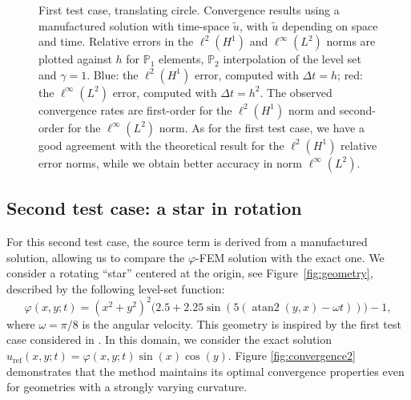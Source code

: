 \documentclass[11pt,a4paper]{article}
\theoremstyle{plain}
\theoremstyle{definition}
\theoremstyle{remark}
\numberwithin{equation}{section}
\newcommand{\logLogSlopeTriangle}[5]
{

    \pgfplotsextra
    {
        \pgfkeysgetvalue{/pgfplots/xmin}{\xmin}
        \pgfkeysgetvalue{/pgfplots/xmax}{\xmax}
        \pgfkeysgetvalue{/pgfplots/ymin}{\ymin}
        \pgfkeysgetvalue{/pgfplots/ymax}{\ymax}

        \pgfmathsetmacro{\xArel}{#1}
        \pgfmathsetmacro{\yArel}{#3}
        \pgfmathsetmacro{\xBrel}{#1-#2}
        \pgfmathsetmacro{\yBrel}{\yArel}
        \pgfmathsetmacro{\xCrel}{\xArel}

        \pgfmathsetmacro{\lnxB}{\xmin*(1-(#1-#2))+\xmax*(#1-#2)} %
        \pgfmathsetmacro{\lnxA}{\xmin*(1-#1)+\xmax*#1} %
        \pgfmathsetmacro{\lnyA}{\ymin*(1-#3)+\ymax*#3} %
        \pgfmathsetmacro{\lnyC}{\lnyA+#4*(\lnxA-\lnxB)}
        \pgfmathsetmacro{\yCrel}{(\lnyC-\ymin)/(\ymax-\ymin)} %

        \coordinate (A) at (rel axis cs:\xArel,\yArel);
        \coordinate (B) at (rel axis cs:\xBrel,\yBrel);
        \coordinate (C) at (rel axis cs:\xCrel,\yCrel);

        \draw[#5]   (A)-- node[pos=0.5,anchor=north] {1}
                    (B)--
                    (C)-- node[pos=0.5,anchor=west] {#4}
                    cycle;
    }
}
\begin{document}
\begin{figure}[h]
    \centering
    
    \begin{center}
    \end{center}
    
    \caption{First test case, translating circle. Convergence results using a manufactured solution with time-space $\tilde{u}$, with $\tilde{u}$ depending on space and time. Relative errors in the $\ell^2(H^1)$ and $\ell^\infty(L^2)$ norms are plotted against $h$ for $\mathbb{P}_1$ elements, $\mathbb{P}_2$ interpolation of the level set and $\gamma=1$. Blue: the $\ell^2(H^1)$ error, computed with $\Delta t = h$; red: the $\ell^\infty(L^2)$ error, computed with $\Delta t = h^2$. The observed convergence rates are first-order for the $\ell^2(H^1)$ norm and second-order for the $\ell^\infty(L^2)$ norm. As for the first test case, we have a good agreement with the theoretical result for the $\ell^2(H^1)$ relative error norms, while we obtain better accuracy in norm $\ell^\infty(L^2)$.}
    \label{fig:convergence1bis}
\end{figure}

\subsection{Second test case: a star in rotation}

\noindent For this second test case, the source term is derived from a manufactured solution, allowing us to compare the $\varphi$-FEM solution with the exact one. We consider a rotating ``star'' centered at the origin, see Figure~\ref{fig:geometry}, described by the following level-set function:
\begin{equation*}
    \varphi(x,y;t) = (x^2 + y^2)^2 \bigl(2.5 + 2.25 \sin(5(\operatorname{atan2}(y, x) - \omega t))\bigr) - 1,
\end{equation*}
where $\omega = \pi/8$ is the angular velocity. {This} geometry is inspired by the first test case considered in \cite{neumann}. In this domain, we consider the exact solution $u_{\mathrm{ref}}(x,y;t)=\varphi(x,y;t)\sin(x)\cos(y)$. Figure \ref{fig:convergence2} demonstrates that the method maintains its optimal convergence properties even for {geometries with a strongly varying curvature}. 
\end{document}
